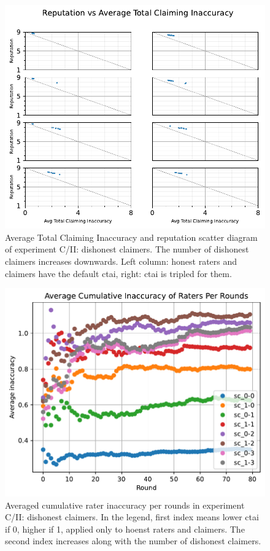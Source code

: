 \documentclass[%
    ]{\PathToTumTemplate/thesis/tum_thesis}
\begin{document}
\begin{figure}[tbp]
  \begin{center}
        \includegraphics[width=0.75\linewidth]	{../results/c2/AvgTotClaimInaccuracyAndReputationScatter_joined.pdf}
    \caption{
    Average Total Claiming Inaccuracy and reputation scatter diagram of experiment C/II: dishonest claimers.
    The number of dishonest claimers increases downwards.
    Left column: honest raters and claimers have the default \gls{ctai}, right: \gls{ctai} is tripled for them.
    }
    \label{fig:res_c2_scatter}
  \end{center}
\end{figure}

\begin{figure}[tbp]
  \begin{center}
        \includegraphics[width=0.75\linewidth]	{../results/c2/AvgAccuracyPerRound.pdf}
    \caption{
    Averaged cumulative rater inaccuracy per rounds in experiment C/II: dishonest claimers.
    In the legend, first index means lower \gls{ctai} if 0, higher if 1, applied only to hoenst raters and claimers.
    The second index increases along with the number of dishonest claimers.
    }
    \label{fig:res_c2_rateinaccuracy}
  \end{center}
\end{figure}
\end{document}
